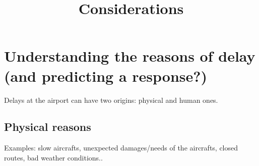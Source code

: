 \documentclass{article}
\begin{document}
	
	\title{Considerations}
	\maketitle
	
	\section*{Understanding the reasons of delay (and predicting a response?)}
	Delays at the airport can have two origins: physical and human ones.
\subsection*{Physical reasons}
Examples: slow aircrafts, unexpected damages/needs of the aircrafts, closed routes, bad weather conditions..
\end{document}
